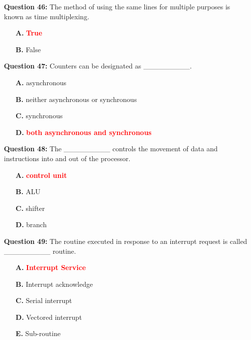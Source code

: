 \documentclass[12pt,a4paper]{article}
\begin{document}
\vspace{0.5cm}

\textbf{Question 46:} The method of using the same lines for multiple purposes is known as time multiplexing.

\begin{itemize}
    \item[\textbf{A.}] \textcolor{red}{\textbf{True}}
    \item[\textbf{B.}] False
\end{itemize}

\vspace{0.5cm}

\textbf{Question 47:} Counters can be designated as _________.

\begin{itemize}
    \item[\textbf{A.}] asynchronous
    \item[\textbf{B.}] neither asynchronous or synchronous
    \item[\textbf{C.}] synchronous
    \item[\textbf{D.}] \textcolor{red}{\textbf{both asynchronous and synchronous}}
\end{itemize}

\vspace{0.5cm}

\textbf{Question 48:} The _________ controls the movement of data and instructions into and out of the processor.

\begin{itemize}
    \item[\textbf{A.}] \textcolor{red}{\textbf{control unit}}
    \item[\textbf{B.}] ALU
    \item[\textbf{C.}] shifter
    \item[\textbf{D.}] branch
\end{itemize}

\vspace{0.5cm}

\textbf{Question 49:} The routine executed in response to an interrupt request is called _________ routine.

\begin{itemize}
    \item[\textbf{A.}] \textcolor{red}{\textbf{Interrupt Service}}
    \item[\textbf{B.}] Interrupt acknowledge
    \item[\textbf{C.}] Serial interrupt
    \item[\textbf{D.}] Vectored interrupt
    \item[\textbf{E.}] Sub-routine
\end{itemize}
\end{document}
